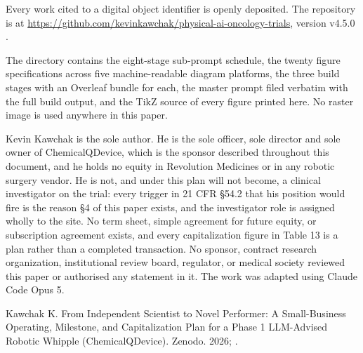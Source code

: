 
{\sloppy Every work cited to a digital object identifier is openly deposited.
The repository is at
\url{https://github.com/kevinkawchak/physical-ai-oncology-trials},
version v4.5.0 \cite{repo2026}.\par} The directory
 contains the eight-stage sub-prompt
schedule, the twenty figure specifications across five machine-readable diagram
platforms, the three build stages with an Overleaf bundle for each, the master
prompt filed verbatim with the full build output, and the TikZ source of every
figure printed here. No raster image is used anywhere in this paper.


Kevin Kawchak is the sole author. He is the sole officer, sole director and sole
owner of ChemicalQDevice, which is the sponsor described throughout this
document, and he holds no equity in Revolution Medicines or in any robotic
surgery vendor. He is not, and under this plan will not become, a clinical
investigator on the trial: every trigger in 21 CFR \S54.2 that his position
would fire is the reason \S4 of this paper exists, and the investigator role is
assigned wholly to the site. No term sheet, simple agreement for future equity,
or subscription agreement exists, and every capitalization figure in Table 13 is
a plan rather than a completed transaction. No sponsor, contract research
organization, institutional review board, regulator, or medical society reviewed
this paper or authorised any statement in it. The work was adapted using Claude
Code Opus 5.


Kawchak K. From Independent Scientist to Novel Performer: A Small-Business
Operating, Milestone, and Capitalization Plan for a Phase 1 LLM-Advised Robotic
Whipple (ChemicalQDevice). Zenodo. 2026; .

\vspace{0.2em}
\apprule{0.5pt}
\vspace{-0.1em}

\vspace{-0.35em}
\begin{apprefs}


\end{apprefs}
